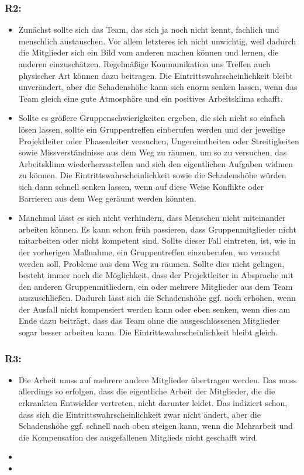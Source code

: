 \documentclass{swp1}
\begin{document}
\subsubsection*{R2:}
\begin{itemize}
\item Zunächst sollte sich das Team, das sich ja noch nicht kennt, fachlich und menschlich austauschen. Vor allem letzteres ich nicht unwichtig, weil dadurch die Mitglieder sich ein Bild vom anderen machen können und lernen, die anderen einzuschätzen. Regelmäßige Kommunikation uns Treffen auch physischer Art können dazu beitragen. Die Eintrittswahrscheinlichkeit bleibt unverändert, aber die Schadenshöhe kann sich enorm senken lassen, wenn das Team gleich eine gute Atmosphäre und ein positives Arbeitsklima schafft.
\item Sollte es größere Gruppenschwierigkeiten ergeben, die sich nicht so einfach lösen lassen, sollte ein Gruppentreffen einberufen werden und der jeweilige Projektleiter oder Phasenleiter versuchen, Ungereimtheiten oder Streitigkeiten sowie Missverständnisse aus dem Weg zu räumen, um so zu versuchen, das Arbeitsklima wiederherzustellen und sich den eigentlichen Aufgaben widmen zu können. Die Eintrittswahrscheinlichkeit sowie die Schadenshöhe würden sich dann schnell senken lassen, wenn auf diese Weise Konflikte oder Barrieren aus dem Weg geräumt werden könnten.
\item Manchmal lässt es sich nicht verhindern, dass Menschen nicht miteinander arbeiten können. Es kann schon früh passieren, dass Gruppenmitglieder nicht mitarbeiten oder nicht kompetent sind. Sollte dieser Fall eintreten, ist, wie in der vorherigen Maßnahme, ein Gruppentreffen einzuberufen, wo versucht werden soll, Probleme aus dem Weg zu räumen. Sollte dies nicht gelingen, besteht immer noch die Möglichkeit, dass der Projektleiter in Absprache mit den anderen Gruppenmitliedern, ein oder mehrere Mitglieder aus dem Team auszuschließen. Dadurch lässt sich die Schadenshöhe ggf. noch erhöhen, wenn der Ausfall nicht kompensiert werden kann oder eben senken, wenn dies am Ende dazu beiträgt, dass das Team ohne die ausgeschlossenen Mitglieder sogar besser arbeiten kann. Die Eintrittswahrscheinlichkeit bleibt gleich. 
\end{itemize}
\subsubsection*{R3:}
\begin{itemize}
\item Die Arbeit muss auf mehrere andere Mitglieder übertragen werden. Das muss allerdings so erfolgen, dass die eigentliche Arbeit der Mitglieder, die die erkrankten Entwickler vertreten, nicht darunter leidet. Das indiziert schon, dass sich die Eintrittswahrscheinlichkeit zwar nicht ändert, aber die Schadenshöhe ggf. schnell nach oben steigen kann, wenn die Mehrarbeit und die Kompensation des ausgefallenen Mitglieds nicht geschafft wird.
\item 
\item
\end{itemize}
\end{document}
